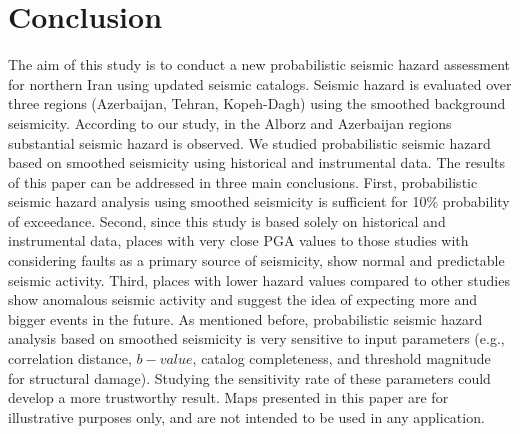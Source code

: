 \section{Conclusion}

The aim of this study is to conduct a new probabilistic seismic hazard assessment for northern Iran using updated seismic catalogs. Seismic hazard is evaluated over three regions (Azerbaijan, Tehran, Kopeh-Dagh) using the smoothed background seismicity. According to our study, in the Alborz  and Azerbaijan regions substantial seismic hazard is observed.  We studied probabilistic seismic hazard based on smoothed seismicity using historical and instrumental data. The results of this paper can be addressed in three main conclusions. First, probabilistic seismic hazard analysis using smoothed seismicity is sufficient for 10\% probability of exceedance. Second, since this study is based solely on historical and instrumental data, places with very close PGA values to those studies with considering faults as a primary source of seismicity, show normal and predictable seismic activity. Third, places with lower hazard values compared to other studies show anomalous seismic activity and suggest the idea of expecting more and bigger events in the future. As mentioned before, probabilistic seismic hazard analysis based on smoothed seismicity is very sensitive to input parameters (e.g., correlation distance, $b-value$, catalog completeness, and threshold magnitude for structural damage). Studying the sensitivity rate of these parameters could develop a more trustworthy result. Maps presented in this paper are for illustrative purposes only, and are not intended to be used in any application. 
